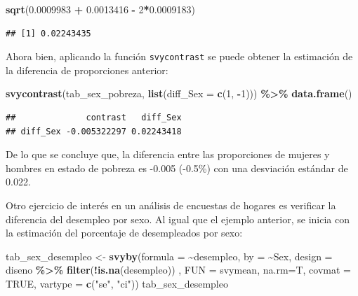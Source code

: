 \documentclass[
  spanish,
  12pt,
]{book}
\newenvironment{Shaded}{\begin{snugshade}}{\end{snugshade}}
\newcommand{\AttributeTok}[1]{\textcolor[rgb]{0.13,0.29,0.53}{#1}}
\newcommand{\ConstantTok}[1]{\textcolor[rgb]{0.56,0.35,0.01}{#1}}
\newcommand{\DecValTok}[1]{\textcolor[rgb]{0.00,0.00,0.81}{#1}}
\newcommand{\FloatTok}[1]{\textcolor[rgb]{0.00,0.00,0.81}{#1}}
\newcommand{\FunctionTok}[1]{\textcolor[rgb]{0.13,0.29,0.53}{\textbf{#1}}}
\newcommand{\NormalTok}[1]{#1}
\newcommand{\OtherTok}[1]{\textcolor[rgb]{0.56,0.35,0.01}{#1}}
\newcommand{\SpecialCharTok}[1]{\textcolor[rgb]{0.81,0.36,0.00}{\textbf{#1}}}
\newcommand{\StringTok}[1]{\textcolor[rgb]{0.31,0.60,0.02}{#1}}
\begin{document}
\begin{Shaded}
\begin{Highlighting}[]
\FunctionTok{sqrt}\NormalTok{(}\FloatTok{0.0009983} \SpecialCharTok{+} \FloatTok{0.0013416} \SpecialCharTok{{-}} \DecValTok{2}\SpecialCharTok{*}\FloatTok{0.0009183}\NormalTok{)}
\end{Highlighting}
\end{Shaded}

\begin{verbatim}
## [1] 0.02243435
\end{verbatim}

Ahora bien, aplicando la función \texttt{svycontrast} se puede obtener la estimación de la diferencia de proporciones anterior:

\begin{Shaded}
\begin{Highlighting}[]
\FunctionTok{svycontrast}\NormalTok{(tab\_sex\_pobreza,}
            \FunctionTok{list}\NormalTok{(}\AttributeTok{diff\_Sex =} \FunctionTok{c}\NormalTok{(}\DecValTok{1}\NormalTok{, }\SpecialCharTok{{-}}\DecValTok{1}\NormalTok{))) }\SpecialCharTok{\%\textgreater{}\%}
  \FunctionTok{data.frame}\NormalTok{()}
\end{Highlighting}
\end{Shaded}

\begin{verbatim}
##              contrast   diff_Sex
## diff_Sex -0.005322297 0.02243418
\end{verbatim}

De lo que se concluye que, la diferencia entre las proporciones de mujeres y hombres en estado de pobreza es -0.005 (-0.5\%) con una desviación estándar de 0.022.

Otro ejercicio de interés en un análisis de encuestas de hogares es verificar la diferencia del desempleo por sexo. Al igual que el ejemplo anterior, se inicia con la estimación del porcentaje de desempleados por sexo:

\begin{Shaded}
\begin{Highlighting}[]
\NormalTok{tab\_sex\_desempleo }\OtherTok{\textless{}{-}} \FunctionTok{svyby}\NormalTok{(}\AttributeTok{formula =} \SpecialCharTok{\textasciitilde{}}\NormalTok{desempleo, }\AttributeTok{by =} \SpecialCharTok{\textasciitilde{}}\NormalTok{Sex, }
                           \AttributeTok{design  =}\NormalTok{ diseno }\SpecialCharTok{\%\textgreater{}\%} \FunctionTok{filter}\NormalTok{(}\SpecialCharTok{!}\FunctionTok{is.na}\NormalTok{(desempleo)) , }
                           \AttributeTok{FUN     =}\NormalTok{ svymean, }\AttributeTok{na.rm=}\NormalTok{T, }\AttributeTok{covmat =} \ConstantTok{TRUE}\NormalTok{,}
                           \AttributeTok{vartype =} \FunctionTok{c}\NormalTok{(}\StringTok{"se"}\NormalTok{, }\StringTok{"ci"}\NormalTok{))}
\NormalTok{tab\_sex\_desempleo}
\end{Highlighting}
\end{Shaded}
\end{document}
